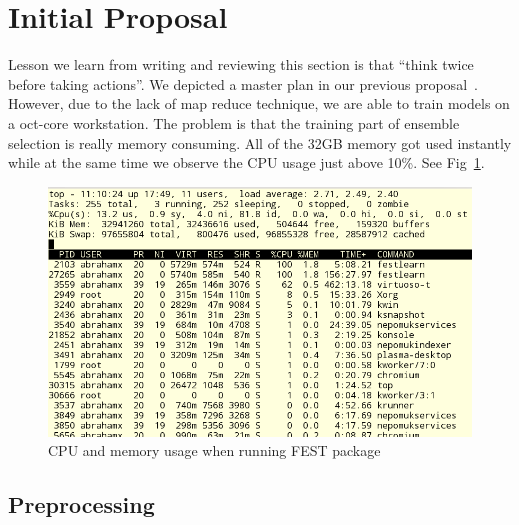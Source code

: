 \documentclass[journal]{IEEEtran}
\begin{document}
\section{Initial Proposal}
\label{sec:initial-plan}
Lesson we learn from writing and reviewing this section is that
``think twice before taking actions''. We depicted a master plan in
our previous proposal~\cite{Ref:Yanan2013}. However, due to the lack
of map reduce technique, we are able to train models on a oct-core
workstation. The problem is that the training part of ensemble
selection is really memory consuming. All of the 32GB memory got used
instantly while at the same time we observe the CPU usage just above
10\%. See Fig~\ref{fig:memory-consuming}.
\begin{figure}[!t]
\centering
\includegraphics[scale=0.35]{Figure/Memory-Consuming.png}
\caption{CPU and memory usage when running FEST package}
\label{fig:memory-consuming}
\end{figure}

\subsection{Preprocessing}
\label{sec:preprocessing}
\end{document}
